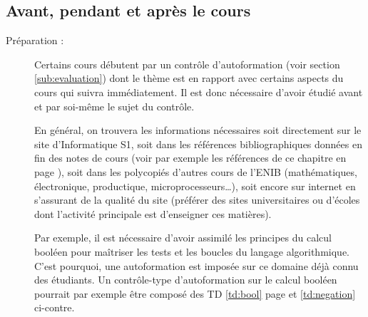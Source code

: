 \subsection{Avant, pendant et après le cours}\label{sub:cours}
\begin{description}
\item[Préparation :] Certains cours débutent par un contrôle d'autoformation
	(voir section \ref{sub:evaluation}) dont le thème est en rapport avec certains
	aspects du cours qui suivra immédiatement.
	Il est donc nécessaire d'avoir étudié avant et par soi-même le
	sujet du contrôle.
	
	En général, on trouvera les informations nécessaires
	soit directement sur le site d'Informatique S1, 
	soit dans les références bibliographiques données en fin des notes de cours
	(voir par exemple les références de ce chapitre en page \pageref{biblio}),
	soit dans les polycopiés d'autres cours de l'ENIB (mathématiques, 
	électronique, productique, microprocesseurs\ldots), soit encore sur internet
	en s'assurant de la qualité du site (préférer des sites universitaires ou 
	d'écoles dont l'activité principale est d'enseigner ces matières).
	
	Par exemple, il est nécessaire d'avoir assimilé les principes
	du calcul booléen pour maîtriser les tests et les boucles du
	langage algorithmique. C'est pourquoi, une autoformation est
	imposée sur ce domaine déjà connu des étudiants.
	Un contrôle-type d'autoformation sur le calcul booléen 
	pourrait par exemple être composé des TD \ref{td:bool} 
	page \pageref{td:bool} et \ref{td:negation} ci-contre.\\
	

\end{description}
